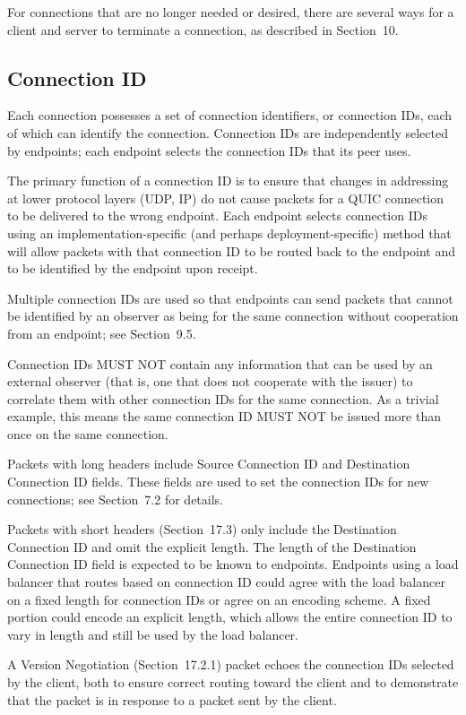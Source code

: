 \documentclass{article}
\begin{document}
For connections that are no longer needed or desired, there are several ways for a client and server to terminate a connection, as described in Section~10.

\subsection{Connection ID}

Each connection possesses a set of connection identifiers, or connection IDs, each of which can identify the connection. Connection IDs are independently selected by endpoints; each endpoint selects the connection IDs that its peer uses.

The primary function of a connection ID is to ensure that changes in addressing at lower protocol layers (UDP, IP) do not cause packets for a QUIC connection to be delivered to the wrong endpoint.  Each endpoint selects connection IDs using an implementation-specific (and perhaps deployment-specific) method that will allow packets with that connection ID to be routed back to the endpoint and to be identified by the endpoint upon receipt.

Multiple connection IDs are used so that endpoints can send packets that cannot be identified by an observer as being for the same connection without cooperation from an endpoint; see Section~9.5.

Connection IDs MUST NOT contain any information that can be used by an external observer (that is, one that does not cooperate with the issuer) to correlate them with other connection IDs for the same connection.  As a trivial example, this means the same connection ID MUST NOT be issued more than once on the same connection.

Packets with long headers include Source Connection ID and Destination Connection ID fields.  These fields are used to set the connection IDs for new connections; see Section~7.2 for details.

Packets with short headers (Section~17.3) only include the Destination Connection ID and omit the explicit length.  The length of the Destination Connection ID field is expected to be known to endpoints.  Endpoints using a load balancer that routes based on connection ID could agree with the load balancer on a fixed length for connection IDs or agree on an encoding scheme.  A fixed portion could encode an explicit length, which allows the entire connection ID to vary in length and still be used by the load balancer.

A Version Negotiation (Section~17.2.1) packet echoes the connection IDs selected by the client, both to ensure correct routing toward the client and to demonstrate that the packet is in response to a packet sent by the client.
\end{document}
